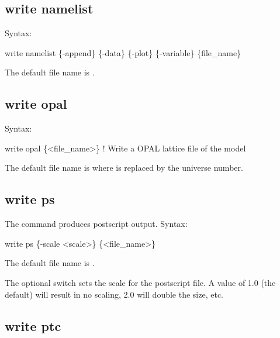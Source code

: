 {{{{{{{{{{{%

\subsection{write namelist}
\label{s:write.namelist}

Syntax:
\begin{example}
    write namelist \{-append\} \{-data\} \{-plot\} \{-variable\} \{file_name\}
\end{example}

The default file name is .


\subsection{write opal}
\label{s:write.opal}

Syntax:
\begin{example}
    write opal \{<file_name>\}  ! Write a OPAL lattice file of the model
\end{example}

The default file name is  where \vn{\#} is replaced by the universe number. 


\subsection{write ps}
\label{s:write.ps}

The  command produces postscript output. Syntax:
\begin{example}
  write ps \{-scale <scale>\} \{<file_name>\}
\end{example}

The default file name is . 

The optional  switch sets the scale for the postscript file. A value of 1.0 (the
default) will result in no scaling, 2.0 will double the size, etc.


\subsection{write ptc}
\label{s:write.ptc}

}}}}}}}}}}}
